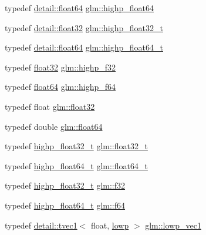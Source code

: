 \begin{DoxyCompactItemize}
\item 
typedef \hyperlink{namespaceglm_1_1detail_a5a0a9a1be3fd5dbe6d47ae45c3022b06}{detail\+::float64} \hyperlink{group__gtc__type__precision_gab871a78c548d2fa53e1e8ec64a46eee7}{glm\+::highp\+\_\+float64}
\item 
typedef \hyperlink{namespaceglm_1_1detail_ad60558c5c304624de0b54c51b5857737}{detail\+::float32} \hyperlink{group__gtc__type__precision_ga4e16a7818d09e2da3b81765999f23928}{glm\+::highp\+\_\+float32\+\_\+t}
\item 
typedef \hyperlink{namespaceglm_1_1detail_a5a0a9a1be3fd5dbe6d47ae45c3022b06}{detail\+::float64} \hyperlink{group__gtc__type__precision_gae8b3b2ace5be2a61c6bf63f12643fa15}{glm\+::highp\+\_\+float64\+\_\+t}
\item 
typedef \hyperlink{group__gtc__type__precision_ga814f2f65354b6588b067cc5c67a6b340}{float32} \hyperlink{group__gtc__type__precision_ga48d80b6fd3a40b71b2e414493832d1ca}{glm\+::highp\+\_\+f32}
\item 
typedef \hyperlink{group__gtc__type__precision_gab721f828b41f46b20cf4883b50733d3b}{float64} \hyperlink{group__gtc__type__precision_gab1306a5a8ae99fb2867b548b1546bbe0}{glm\+::highp\+\_\+f64}
\item 
typedef float \hyperlink{group__gtc__type__precision_ga814f2f65354b6588b067cc5c67a6b340}{glm\+::float32}
\item 
typedef double \hyperlink{group__gtc__type__precision_gab721f828b41f46b20cf4883b50733d3b}{glm\+::float64}
\item 
typedef \hyperlink{group__gtc__type__precision_ga4e16a7818d09e2da3b81765999f23928}{highp\+\_\+float32\+\_\+t} \hyperlink{group__gtc__type__precision_ga642737ae3e7c434b366f2191e6944bf2}{glm\+::float32\+\_\+t}
\item 
typedef \hyperlink{group__gtc__type__precision_gae8b3b2ace5be2a61c6bf63f12643fa15}{highp\+\_\+float64\+\_\+t} \hyperlink{group__gtc__type__precision_gade966a3eb25ebeb16dd53c40d3fdeb46}{glm\+::float64\+\_\+t}
\item 
typedef \hyperlink{group__gtc__type__precision_ga4e16a7818d09e2da3b81765999f23928}{highp\+\_\+float32\+\_\+t} \hyperlink{group__gtc__type__precision_ga0ec999b57f5330d9021256e96038df04}{glm\+::f32}
\item 
typedef \hyperlink{group__gtc__type__precision_gae8b3b2ace5be2a61c6bf63f12643fa15}{highp\+\_\+float64\+\_\+t} \hyperlink{group__gtc__type__precision_ga2bba392e555124b36cde6abba349bab3}{glm\+::f64}
\item 
typedef \hyperlink{structglm_1_1detail_1_1tvec1}{detail\+::tvec1}$<$ float, \hyperlink{namespaceglm_a0f04f086094c747d227af4425893f545ae161af3fc695e696ce3bf69f7332bc2d}{lowp} $>$ \hyperlink{group__gtc__type__precision_gae48c64f920be353ece773ff367f0161c}{glm\+::lowp\+\_\+vec1}

\end{DoxyCompactItemize}
